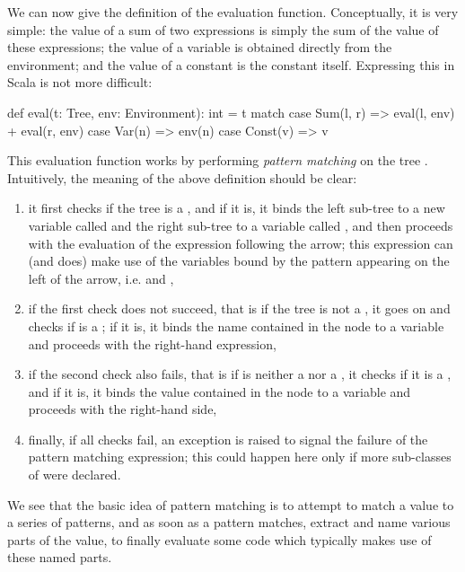 \documentclass[a4paper,12pt,twoside,titlepage]{article}
\newcommand{\langname}[1]{#1\xspace}
\newcommand{\Scala}{\langname{Scala}}
\begin{document}
We can now give the definition of the evaluation function.
Conceptually, it is very simple: the value of a sum of two expressions
is simply the sum of the value of these expressions; the value of a
variable is obtained directly from the environment; and the value of a
constant is the constant itself. Expressing this in \Scala is not more
difficult:
\begin{scalacode}
  def eval(t: Tree, env: Environment): int = t match {
    case Sum(l, r) => eval(l, env) + eval(r, env)
    case Var(n)    => env(n)
    case Const(v)  => v
  }
\end{scalacode}
This evaluation function works by performing \emph{pattern matching}
on the tree . Intuitively, the meaning of the above definition
should be clear:
\begin{enumerate}
\item it first checks if the tree  is a , and if it
  is, it binds the left sub-tree to a new variable called  and
  the right sub-tree to a variable called , and then proceeds
  with the evaluation of the expression following the arrow; this
  expression can (and does) make use of the variables bound by the
  pattern appearing on the left of the arrow, i.e.  and
  ,
\item if the first check does not succeed, that is if the tree is not
  a , it goes on and checks if  is a ; if
  it is, it binds the name contained in the  node to a
  variable  and proceeds with the right-hand expression,
\item if the second check also fails, that is if  is neither a
   nor a , it checks if it is a , and
  if it is, it binds the value contained in the  node to a
  variable  and proceeds with the right-hand side,
\item finally, if all checks fail, an exception is raised to signal
  the failure of the pattern matching expression; this could happen
  here only if more sub-classes of  were declared.
\end{enumerate}
We see that the basic idea of pattern matching is to attempt to match
a value to a series of patterns, and as soon as a pattern matches,
extract and name various parts of the value, to finally evaluate some
code which typically makes use of these named parts.
\end{document}
